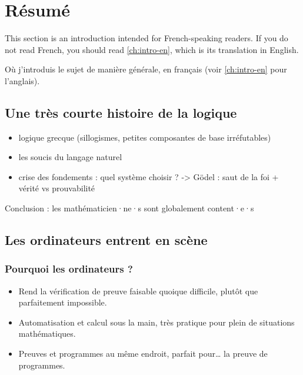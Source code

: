 \chapter{Résumé}
\label{ch:intro-fr}

\begin{kaobox}[frametitle=Warning for the English-speaking readers, backgroundcolor=Black!10!White,frametitlebackgroundcolor=Black!10!White]
  This section is an introduction intended for French-speaking readers. If you do not
  read French, you should read \cref{ch:intro-en}, which is its translation in English.
\end{kaobox}

Où j’introduis le sujet de manière générale, en français (voir \cref{ch:intro-en} pour l’anglais).

\section{Une très courte histoire de la logique}

\begin{itemize}
  \item logique grecque (sillogismes, petites composantes de base irréfutables)
  \item les soucis du langage naturel
  \item crise des fondements : quel système choisir ? -> Gödel : saut de la foi + vérité vs prouvabilité
\end{itemize}
Conclusion : les mathématicien·ne·s sont globalement content·e·s

\section{Les ordinateurs entrent en scène}

\subsection{Pourquoi les ordinateurs ?}

\begin{itemize}
  \item Rend la vérification de preuve faisable quoique difficile, plutôt que parfaitement impossible.
  \item Automatisation et calcul sous la main, très pratique pour plein de situations mathématiques.
  \item Preuves et programmes au même endroit, parfait pour… la preuve de programmes.
\end{itemize}

